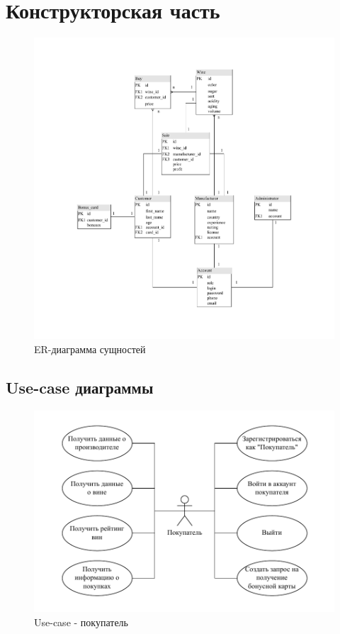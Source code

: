\chapter{Конструкторская часть}

\begin{figure}[H]
	\begin{center}
		\includegraphics[scale=0.75]{img/ER-diagram.pdf}
	\end{center}
	\captionsetup{justification=centering}
	\caption{ER-диаграмма сущностей}
	\label{img:er}
\end{figure}

\section{Use-case диаграммы}

\begin{figure}[H]
	\begin{center}
		\includegraphics[scale=0.8]{img/customer.pdf}
	\end{center}
	\captionsetup{justification=centering}
	\caption{Use-case - покупатель}
	\label{img:customer}
\end{figure}

